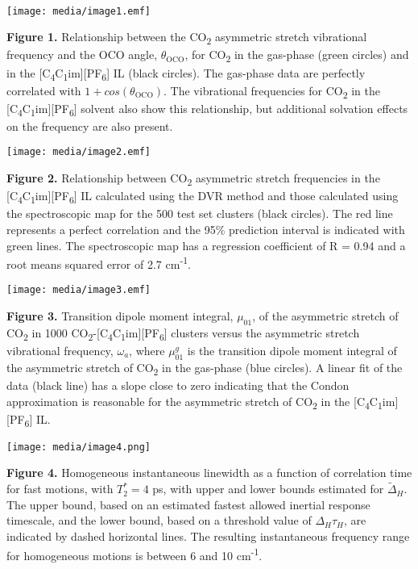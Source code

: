 \documentclass[]{article}
\begin{document}
\emph{\\
}

\texttt{[image: media/image1.emf]}

\textbf{Figure 1.} Relationship between the CO\textsubscript{2}
asymmetric stretch vibrational frequency and the OCO angle,
\(\theta_{\text{OCO}}\), for CO\textsubscript{2} in the gas-phase (green
circles) and in the
{[}C\textsubscript{4}C\textsubscript{1}im{]}{[}PF\textsubscript{6}{]} IL
(black circles). The gas-phase data are perfectly correlated with
\(1 + cos(\theta_{\text{OCO}})\). The vibrational frequencies for
CO\textsubscript{2} in the
{[}C\textsubscript{4}C\textsubscript{1}im{]}{[}PF\textsubscript{6}{]}
solvent also show this relationship, but additional solvation effects on
the frequency are also present.

\texttt{[image: media/image2.emf]}

\textbf{Figure 2.} Relationship between CO\textsubscript{2} asymmetric
stretch frequencies in the
{[}C\textsubscript{4}C\textsubscript{1}im{]}{[}PF\textsubscript{6}{]} IL
calculated using the DVR method and those calculated using the
spectroscopic map for the 500 test set clusters (black circles). The red
line represents a perfect correlation and the 95\% prediction interval
is indicated with green lines. The spectroscopic map has a regression
coefficient of R = 0.94 and a root means squared error of 2.7
cm\textsuperscript{-1}.

\texttt{[image: media/image3.emf]}

\textbf{Figure 3.} Transition dipole moment integral, \(\mu_{01}\), of
the asymmetric stretch of CO\textsubscript{2} in 1000
CO\textsubscript{2}-{[}C\textsubscript{4}C\textsubscript{1}im{]}{[}PF\textsubscript{6}{]}
clusters versus the asymmetric stretch vibrational frequency,
\(\omega_{a}\), where \(\mu_{01}^{g}\) is the transition dipole moment
integral of the asymmetric stretch of CO\textsubscript{2} in the
gas-phase (blue circles). A linear fit of the data (black line) has a
slope close to zero indicating that the Condon approximation is
reasonable for the asymmetric stretch of CO\textsubscript{2} in the
{[}C\textsubscript{4}C\textsubscript{1}im{]}{[}PF\textsubscript{6}{]}
IL.

\texttt{[image: media/image4.png]}

\textbf{Figure 4.} Homogeneous instantaneous linewidth as a function of
correlation time for fast motions, with \(T_{2}^{*} = 4\) ps, with upper
and lower bounds estimated for \({\widetilde{\Delta}}_{H}\). The upper
bound, based on an estimated fastest allowed inertial response
timescale, and the lower bound, based on a threshold value of
\(\Delta_{H}\tau_{H}\), are indicated by dashed horizontal lines. The
resulting instantaneous frequency range for homogeneous motions is
between 6 and 10 cm\textsuperscript{-1}.
\end{document}
